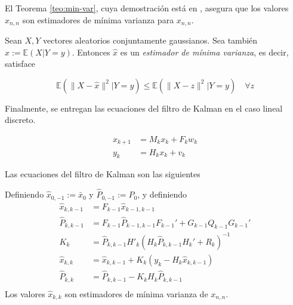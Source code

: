 El Teorema \ref{teo:min-var}, cuya demostración está en \cite{}, asegura que los valores \(\hat{x}_{n,n}\) son estimadores de mínima varianza para \(x_{n,n}\).

\begin{teo}
\label{teo:min-var}
Sean \(X, Y\) vectores aleatorios conjuntamente gaussianos. Sea también \(\hat{x} := \mathbb{E}(X|Y=y)\). Entonces \(\hat{x}\) es un
\emph{estimador de mínima varianza}, es decir, satisface

\[
\mathbb{E}(\| X - \hat{x}\|^2 | Y = y) \leq \mathbb{E}(\| X - z\|^2 | Y = y) \quad \forall z
\]
\end{teo}

Finalmente, se entregan las ecuaciones del filtro de Kalman en el caso lineal discreto.

\[
\begin{aligned}
x_{k+1} &= M_k x_k + F_k w_k \\ 
y_k &= H_k x_k + v_k
\end{aligned}
\]

Las ecuaciones del filtro de Kalman son las siguientes 


\begin{mdframed}[style=mystyle,frametitle=Filtro de Kalman Lineal Discreto]
Definiendo \(\hat{x}_{0,-1}:= \bar{x}_0\) y \(\hat{P}_{0,-1}:= P_0\), y definiendo 
\[
\begin{aligned}
\hat{x}_{k,k-1} &= F_{k-1} \hat{x}_{k-1,k-1} \\
\hat{P}_{k,k-1} &= F_{k-1} \hat{P}_{k-1,k-1} F_{k-1}' + G_{k-1} Q_{k-1} G_{k-1}'\\
K_k &= \hat{P}_{k,k-1} H'_{k}(H_{k}\hat{P}_{k,k-1}H_{k}' + R_k)^{-1}\\
\hat{x}_{k,k} &= \hat{x}_{k, k-1} + K_k(y_k-H_k \hat{x}_{k,k-1}) \\
\hat{P}_{k,k} &= \hat{P}_{k,k-1}- K_k H_{k}\hat{P}_{k,k-1} \\
\end{aligned}
\]
Los valores \(\hat{x}_{k,k}\) son estimadores de mínima varianza de \(x_{n,n}\). 
\end{mdframed}




